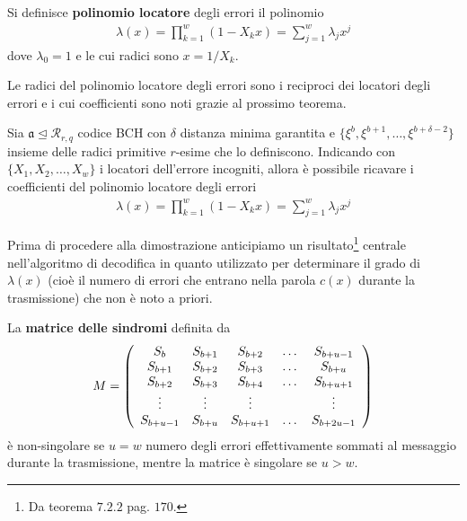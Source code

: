 \begin{definizione}
   Si definisce {\bf polinomio locatore} degli errori il polinomio 
   \begin{align*}
      \lambda (x) = \prod_{k=1}^{w} (1 - X_{k}x)= \sum_{j=1}^{w}\lambda_{j}x^{j}
   \end{align*}
   dove $\lambda_{0} = 1$ e le cui radici sono $x = 1/X_{k}$.
\end{definizione}
Le radici del polinomio locatore degli errori sono i reciproci dei locatori degli errori e i cui coefficienti sono noti grazie al prossimo teorema. 
\begin{teorema}\label{teo:poliLocatore}
   Sia $\mathfrak{a} \trianglelefteq  \mathcal{R}_{r,q} $ codice BCH con $\delta$ distanza minima garantita e $\lbrace \xi^{b}, \xi^{b+1}, \dots , \xi^{b + \delta - 2} \rbrace$ insieme delle radici primitive $r$-esime che lo definiscono. Indicando con $\lbrace X_{1}, X_{2}, \dots , X_{w} \rbrace$ i locatori dell'errore incogniti, allora è possibile ricavare i coefficienti del polinomio locatore degli errori
   \begin{align*}
      \lambda (x) = \prod_{k=1}^{w} (1 - X_{k}x)= \sum_{j=1}^{w}\lambda_{j}x^{j}
   \end{align*}
\end{teorema}
Prima di procedere alla dimostrazione anticipiamo un risultato\footnote{Da \cite{blahut} teorema $7.2.2$ pag. $170$.} centrale nell'algoritmo di decodifica in quanto utilizzato per determinare il grado di $\lambda (x)$ (cioè il numero di errori che entrano nella parola $c(x)$ durante la trasmissione) che non è noto a priori. 
\begin{lemmax}\label{le:matriceSindromi}
   La {\bf matrice delle sindromi} definita da
   \begin{align*}
        M =
 	\left(
 	\begin{array} {c c c c c}
 	S_{b} & S_{b + 1} & S_{b + 2} & \dots & S_{b + u - 1}   \\
        S_{b + 1} & S_{b + 2} & S_{b + 3} & \dots & S_{b+u}   \\
        S_{b + 2} & S_{b + 3} & S_{b + 4} & \dots & S_{b + u + 1}   \\
        \vdots & \vdots & \vdots &  & \vdots   \\
        S_{b + u - 1} & S_{b + u} & S_{b + u +1} & \dots & S_{b + 2u -1}           
 	\end{array}
 	\right)
     \end{align*} 
     è non-singolare se $u=w$ numero degli errori effettivamente sommati al messaggio durante la trasmissione, mentre la matrice è singolare se $u > w$.
\end{lemmax}
